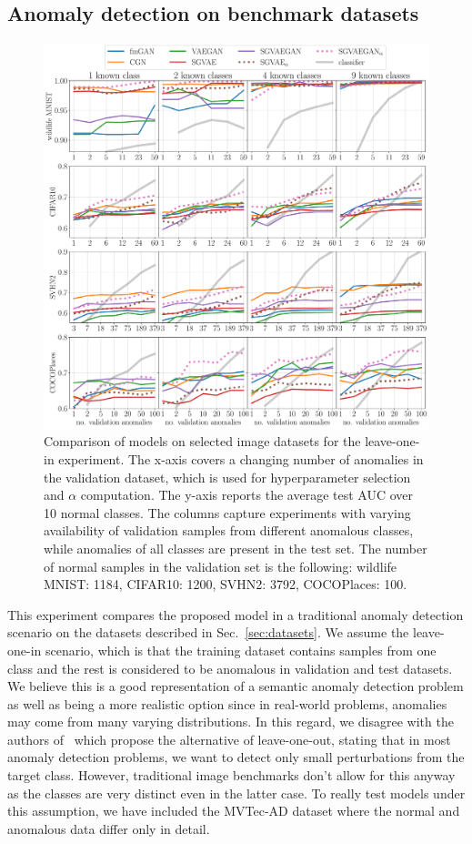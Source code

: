 \subsection{Anomaly detection on benchmark datasets} \label{sec:benchmarks}
\begin{figure}[ht!]
    \centering
        \includegraphics[width=\textwidth]{data/chapter_sgvaegan/all.pdf}
    \caption{Comparison of models on selected image datasets for the leave-one-in experiment. The x-axis covers a changing number of anomalies in the validation dataset, which is used for hyperparameter selection and $\alpha$ computation. The y-axis reports the average test AUC over 10 normal classes. The columns capture experiments with varying availability of validation samples from different anomalous classes, while anomalies of all classes are present in the test set. The number of normal samples in the validation set is the following: wildlife MNIST: 1184, CIFAR10: 1200, SVHN2: 3792, COCOPlaces: 100.}
    \label{fig:kplots}
\end{figure}

This experiment compares the proposed model in a traditional anomaly detection scenario on the datasets described in Sec.~\ref{sec:datasets}. We assume the leave-one-in scenario, which is that the training dataset contains samples from one class and the rest is considered to be anomalous in validation and test datasets. We believe this is a good representation of a semantic anomaly detection problem as well as being a more realistic option since in real-world problems, anomalies may come from many varying distributions. In this regard, we disagree with the authors of~\cite{ahmed2020detecting} which propose the alternative of leave-one-out, stating that in most anomaly detection problems, we want to detect only small perturbations from the target class. However, traditional image benchmarks don't allow for this anyway as the classes are very distinct even in the latter case. To really test models under this assumption, we have included the MVTec-AD dataset where the normal and anomalous data differ only in detail.

